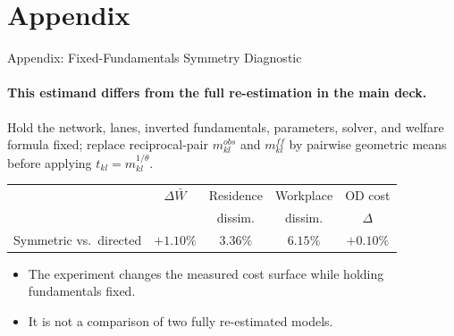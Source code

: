\documentclass[11pt,aspectratio=169]{beamer}
\newcommand{\good}[1]{\textcolor{blue!70!black}{#1}}
\begin{document}
\section{Appendix}
\begin{frame}[label=appsymfixed]{Appendix: Fixed-Fundamentals Symmetry Diagnostic}
\framesubtitle{This estimand differs from the full re-estimation in the main deck.}
\footnotesize
Hold the network, lanes, inverted fundamentals, parameters, solver, and welfare formula fixed; replace reciprocal-pair $m_{kl}^{obs}$ and $m_{kl}^{ff}$ by pairwise geometric means before applying $t_{kl}=m_{kl}^{1/\theta}$.
\vspace{0.45em}
\begin{center}
\scriptsize
\begin{tabular}{lcccc}
\toprule
 & $\Delta\bar W$ & Residence & Workplace & OD cost \\
 &  & dissim. & dissim. & $\Delta$ \\
\midrule
Symmetric vs.\ directed & \good{$+1.10\%$} & $3.36\%$ & $6.15\%$ & $+0.10\%$ \\
\bottomrule
\end{tabular}
\end{center}
\vspace{0.35em}
\begin{itemize}\footnotesize
  \item The experiment changes the measured cost surface while holding fundamentals fixed.
  \item It is not a comparison of two fully re-estimated models.
\end{itemize}
\end{frame}
\end{document}

